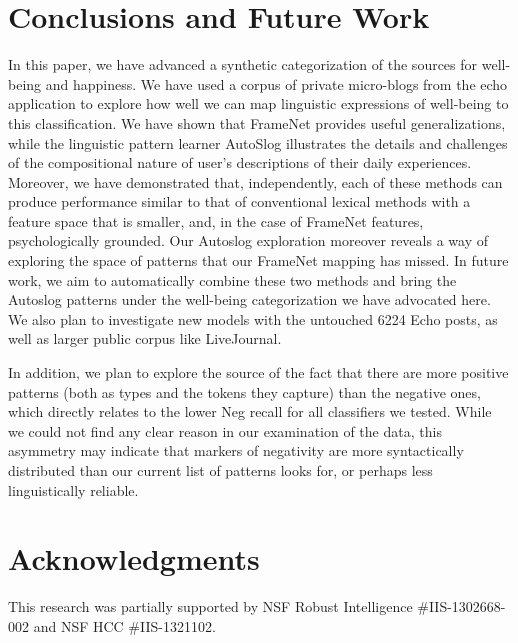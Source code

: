 \documentclass[11pt,letterpaper]{article}
\begin{document}
\section{Conclusions and Future Work}
In this paper, we have advanced a synthetic categorization of the
sources for well-being and happiness. We have used a corpus of private
micro-blogs from the {\sc echo} application to explore how well we can
map linguistic expressions of well-being to this classification. We
have shown that FrameNet provides useful generalizations, while the
linguistic pattern learner AutoSlog illustrates the details and
challenges of the compositional nature of user's descriptions of their
daily experiences. Moreover, we have demonstrated that, independently,
each of these methods can produce performance similar to that of
conventional lexical methods with a feature space that is smaller,
and, in the case of FrameNet features, psychologically grounded. Our
Autoslog exploration moreover reveals a way of exploring the space of
patterns that our FrameNet mapping has missed. In future work, we aim
to automatically combine these two methods and bring the Autoslog
patterns under the well-being categorization we have advocated here.
We also plan to investigate new models with the untouched 6224 Echo
posts, as well as larger public corpus like LiveJournal.

In addition, we plan to explore the source of the fact that there are
more positive patterns (both as types and the tokens they capture)
than the negative ones, which directly relates to the lower Neg recall
for all classifiers we tested.  While we could not find any clear
reason in our examination of the data, this asymmetry may indicate
that markers of negativity are more syntactically distributed than our
current list of patterns looks for, or perhaps less linguistically
reliable.



\section*{Acknowledgments}

This research was partially supported by NSF Robust Intelligence \#IIS-1302668-002 and 
NSF HCC \#IIS-1321102.


 


%


%
\end{document}
